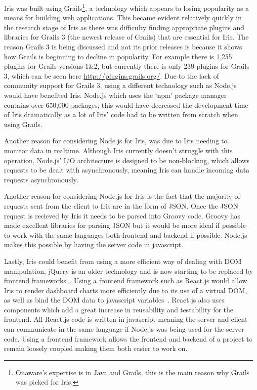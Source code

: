 \documentclass[12pt,a4paper,titlepage]{report}
\begin{document}
Iris was built using Grails\footnote{Onaware's expertise is in Java and Grails, this is the main reason why Grails was picked for Iris.}, a technology which appears to losing popularity as a means for building web applications. This became evident relatively quickly in the research stage of Iris as there was difficulty finding appropriate plugins and libraries for Grails 3 (the newest release of Grails) that are essential for Iris. The reason Grails 3 is being discussed and not its prior releases is because it shows how Grails is beginning to decline in popularity. For example there is 1,255 plugins for Grails versions 1\&2, but currently there is only 239 plugins for Grails 3, which can be seen here \url{http://plugins.grails.org/}. Due to the lack of community support for Grails 3, using a different technology such as Node.js would have benefited Iris. Node.js which uses the `npm' package manager contains over 650,000 packages, this would have decreased the development time of Iris dramatically as a lot of Iris' code had to be written from scratch when using Grails.

Another reason for considering Node.js for Iris, was due to Iris needing to monitor data in realtime. Although Iris currently doesn't struggle with this operation, Node.js' I/O architecture is designed to be non-blocking, which allows requests to be dealt with asynchronously, meaning Iris can handle incoming data requests asynchronously.

Another reason for considering Node.js for Iris is the fact that the majority of requests sent from the client to Iris are in the form of JSON. Once the JSON request is recieved by Iris it needs to be parsed into Groovy code. Groovy has made excellent libraries for parsing JSON but it would be more ideal if possible to work with the same languages both frontend and backend if possible. Node.js makes this possible by having the server code in javascript.

Lastly, Iris could benefit from using a more efficient way of dealing with DOM manipulation, jQuery is an older technology and is now starting to be replaced by frontend frameworks~\parencite{Allen}. Using a frontend framework such as React.js would allow Iris to render dashboard charts more efficiently due to its use of a virtual DOM, as well as bind the DOM data to javascript variables~\parencite{React.js}. React.js also uses components which add a great increase in reusability and testability for the frontend. All React.js code is written in javascript meaning the server and client can communicate in the same language if Node.js was being used for the server code. Using a frontend framework allows the frontend and backend of a project to remain loosely coupled making them both easier to work on.
\end{document}
